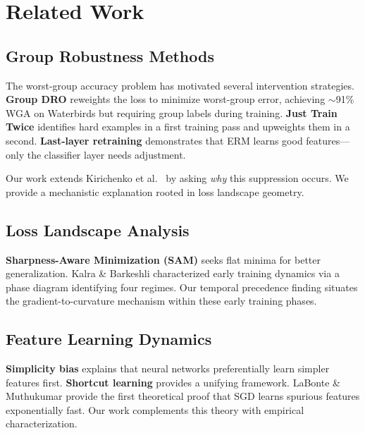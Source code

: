 \section{Related Work}

\subsection{Group Robustness Methods}

The worst-group accuracy problem has motivated several intervention strategies. \textbf{Group DRO} \cite{sagawa2020distributionally} reweights the loss to minimize worst-group error, achieving $\sim$91\% WGA on Waterbirds but requiring group labels during training. \textbf{Just Train Twice} \cite{liu2021just} identifies hard examples in a first training pass and upweights them in a second. \textbf{Last-layer retraining} \cite{kirichenko2023last} demonstrates that ERM learns good features---only the classifier layer needs adjustment.

Our work extends Kirichenko et al.\ \cite{kirichenko2023last} by asking \emph{why} this suppression occurs. We provide a mechanistic explanation rooted in loss landscape geometry.

\subsection{Loss Landscape Analysis}

\textbf{Sharpness-Aware Minimization (SAM)} \cite{foret2021sharpness} seeks flat minima for better generalization. Kalra \& Barkeshli \cite{kalra2023phase} characterized early training dynamics via a phase diagram identifying four regimes. Our temporal precedence finding situates the gradient-to-curvature mechanism within these early training phases.

\subsection{Feature Learning Dynamics}

\textbf{Simplicity bias} \cite{shah2020pitfalls} explains that neural networks preferentially learn simpler features first. \textbf{Shortcut learning} \cite{geirhos2020shortcut} provides a unifying framework. LaBonte \& Muthukumar \cite{labonte2026sgd} provide the first theoretical proof that SGD learns spurious features exponentially fast. Our work complements this theory with empirical characterization.
